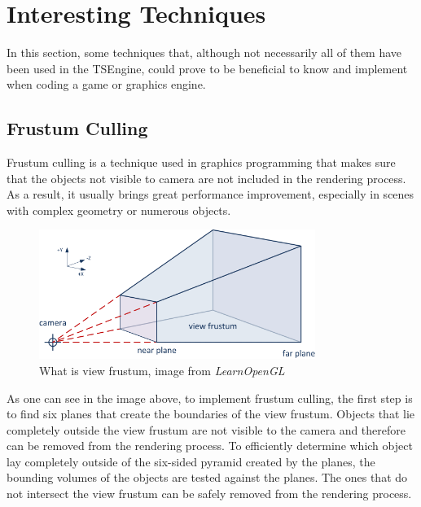 \newpage
\section{Interesting Techniques}
\hspace{\parindent}
In this section, some techniques that, although not necessarily all of them have been used in the TSEngine, could prove to be beneficial to know and implement when coding a game or graphics engine.

\subsection{Frustum Culling}
\hspace{\parindent}
Frustum culling is a technique used in graphics programming that makes sure that the objects  not visible to camera are not included in the rendering process. As a result, it usually brings great performance improvement, especially in scenes with  complex geometry or numerous objects.
\begin{figure}[H]
    \begin{center}
    \includegraphics[width=0.8\textwidth]{figures/VisualCameraFrustum.png}
    \end{center}
    \caption{What is view frustum, image from \textit{LearnOpenGL} \cite{learnopengl} }
\end{figure}
As one can see in the image above, to implement frustum culling, the first step is to find six planes that create the boundaries of the view frustum. Objects that lie completely outside the view frustum are not visible to the camera and therefore can be removed from the rendering process. To efficiently determine which object lay completely outside of the six-sided pyramid created by the planes, the bounding volumes of the objects are tested against the planes. The ones that do not intersect the view frustum can be safely removed from the rendering process.

